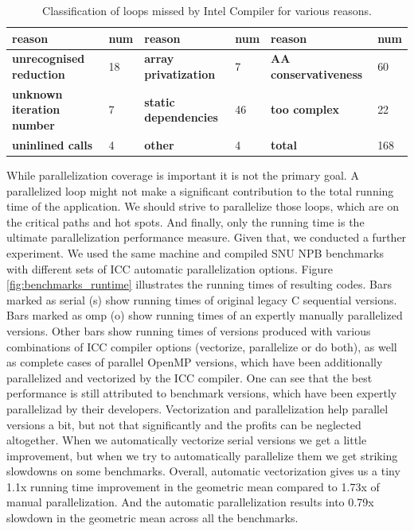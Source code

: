 \begin{table}
  \begin{minipage}{\pagewidth}
  \begin{center}
    \begin{tabu}{M{3.0cm}M{1.0cm}M{3.0cm}M{1.0cm}M{3.0cm}M{1.0cm}}
      \hline
      \rowfont{\bfseries}
      reason & num & reason & num & reason & num\\\hline
      \textbf{unrecognised reduction} & 18 & \textbf{array privatization} & 7 & \textbf{AA conservativeness} & 60\\\hline
      \textbf{unknown iteration number} & 7 & \textbf{static dependencies} & 46 & \textbf{too complex} & 22\\\hline
      \textbf{uninlined calls} & 4 & \textbf{other} & 4 & \textbf{total} & 168\\\hline
    \end{tabu}
  \end{center}
  \end{minipage}
  \caption{Classification of loops missed by Intel Compiler for various reasons.}
  \label{tab:icc_missed}
\end{table}\newline\null
\quad While parallelization coverage is important it is not the primary goal. A parallelized loop might not make a significant contribution to the total running time of the application. We should strive to parallelize those loops, which are on the critical paths and hot spots. And finally, only the running time is the ultimate parallelization performance measure. Given that, we conducted a further experiment. We used the same machine and compiled SNU NPB benchmarks with different sets of ICC automatic parallelization options. Figure \ref{fig:benchmarks_runtime} illustrates the running times of resulting codes. Bars marked as serial (s) show running times of original legacy C sequential versions. Bars marked as omp (o) show running times of an expertly manually parallelized versions. Other bars show running times of versions produced with various combinations of ICC compiler options (vectorize, parallelize or do both), as well as complete cases of parallel OpenMP versions, which have been additionally parallelized and vectorized by the ICC compiler. One can see that the best performance is still attributed to benchmark versions, which have been expertly parallelizad by their developers. Vectorization and parallelization help parallel versions a bit, but not that significantly and the profits can be neglected altogether. When we automatically vectorize serial versions we get a little improvement, but when we try to automatically parallelize them we get striking slowdowns on some benchmarks. Overall, automatic vectorization gives us a tiny 1.1x running time improvement in the geometric mean compared to 1.73x of manual parallelization. And the automatic parallelization results into 0.79x slowdown in the geometric mean across all the benchmarks.\newline\null

